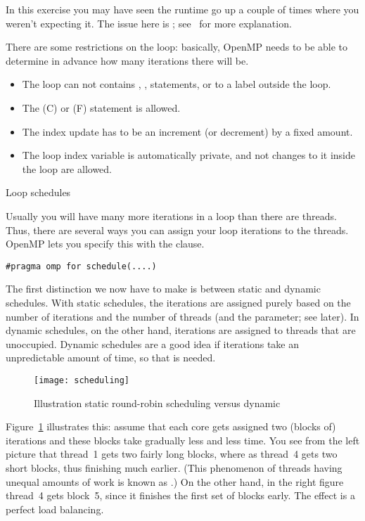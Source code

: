 \begin{remark}
  In this exercise you may have seen the runtime go up a couple of times
  where you weren't expecting it. The issue here is ; see~ for more explanation.
\end{remark}

There are some restrictions on the loop: basically, OpenMP needs to be
able to determine in advance how many iterations there will be.
\begin{itemize}
\item The loop can not contains , ,  statements, or
   to a label outside the loop.
\item The  (C) or  (F) statement is allowed.
\item The index update has to be an increment (or decrement) by a fixed amount.
\item The loop index variable is automatically private, and not changes to it
  inside the loop are allowed.
\end{itemize}

 {Loop schedules}
\label{sec:schedule}

Usually you will have many more iterations in a loop than there are threads.
Thus, there are several ways you can assign your loop iterations to the threads.
OpenMP lets you specify this with the  clause.
\begin{verbatim}
#pragma omp for schedule(....)
\end{verbatim}

The first distinction we now have to make is between static and dynamic schedules.
With static schedules, the iterations are assigned purely based on the number
of iterations and the number of threads (and the  parameter; see later).
In dynamic schedules, on the other hand, iterations are assigned to threads that
are unoccupied. Dynamic schedules are a good idea if iterations take an unpredictable
amount of time, so that  is needed.

\begin{figure}[ht]
  \texttt{[image: scheduling]}
  \caption{Illustration static round-robin scheduling versus dynamic}
  \label{fig:omp-robin}
\end{figure}
%
Figure~\ref{fig:omp-robin} illustrates this: assume that each core
gets assigned two (blocks of) iterations and these blocks take
gradually less and less time. You see from the left picture that
thread~1 gets two fairly long blocks, where as thread~4 gets two short
blocks, thus finishing much earlier. (This phenomenon of threads
having unequal amounts of work is known as .) On the other hand, in the right figure thread~4 gets
block~5, since it finishes the first set of blocks early. The effect
is a perfect load balancing.

